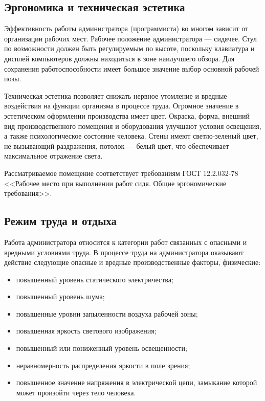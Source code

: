\subsection{Эргономика и техническая эстетика}

Эффективность работы администратора (программиста) во многом зависит от организации рабочих мест.
Рабочее положение администратора --- сидячее.
Стул по возможности должен быть регулируемым по высоте, поскольку клавиатура и дисплей компьютеров должны находиться в зоне наилучшего обзора.
Для сохранения работоспособности имеет большое значение выбор основной рабочей позы.

Техническая эстетика позволяет снижать нервное утомление и вредные воздействия на функции организма в процессе труда.
Огромное значение в эстетическом оформлении производства имеет цвет.
Окраска, форма, внешний вид производственного помещения и оборудования улучшают условия освещения, а также психологическое состояние человека. Стены имеют светло-зеленый цвет, не вызывающий раздражения, потолок --- белый цвет, что обеспечивает максимальное отражение света.

Рассматриваемое помещение соответствует требованиям ГОСТ 12.2.032-78 <<Рабочее место при выполнении работ сидя. Общие эргономические требования>>.

\subsection{Режим труда и отдыха}

Работа администратора относится к категории работ связанных с опасными и вредными условиями труда.
В процессе труда на администратора оказывают действие следующие опасные и вредные производственные факторы, физические:
\begin{itemize}
  \item повышенный уровень статического электричества;
  \item повышенный уровень шума;
  \item повышенные уровни запыленности воздуха рабочей зоны;
  \item повышенная яркость светового изображения;
  \item повышенный или пониженный уровень освещенности;
  \item неравномерность распределения яркости в поле зрения;
  \item повышенное значение напряжения в электрической цепи, замыкание которой может произойти через тело человека.
\end{itemize}

